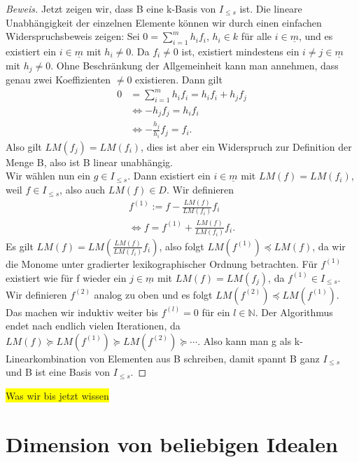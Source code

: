 \documentclass{article}
\newcommand*{\I}{I_{\leq s}}
\begin{document}
\begin{proof}[Beweis]
	Jetzt zeigen wir, dass B eine k-Basis von \(\I\) ist. Die lineare Unabhängigkeit der einzelnen 
	Elemente können wir durch einen einfachen Widerspruchsbeweis zeigen:
	Sei \(0 = \sum_{i=1}^{m} h_{i}f_{i}\), \(h_{i} \in k\) für alle \(i \in \underline{m}\),
	und es existiert ein \(i \in \underline{m}\) mit \(h_{i} \neq 0\).
	Da \(f_{i} \neq 0\) ist, existiert mindestens ein \(i \neq j \in \underline
	{m}\) mit \(h_{j} \neq 0\). Ohne Beschränkung der Allgemeinheit kann man annehmen, dass genau
	zwei Koeffizienten \(\neq 0\) existieren. Dann gilt
	\begin{align*}
		0 &= \sum_{i=1}^{m} h_{i}f_{i} = h_{i}f_{i} + h_{j}f_{j} \\
		&\Leftrightarrow -h_{j}f_{j} = h_{i}f_{i} \\
		&\Leftrightarrow -\frac{h_{j}}{h_{i}} f_{j} = f_{i}.
	\end{align*}
	Also gilt \(LM(f_{j}) = LM(f_{i})\), dies ist aber ein Widerspruch zur Definition der Menge B,
	also ist B linear unabhängig. \\
	Wir wählen nun ein \(g \in \I\). Dann existiert ein \(i \in \underline{m}\) mit \(LM(f) =
	LM(f_{i})\), weil \(f \in \I\), also auch \(LM(f) \in D\). Wir definieren
	\begin{align*}
		f^{(1)} := f - \frac{LM(f)}{LM(f_{i})}f_{i} \\
		\Leftrightarrow f = f^{(1)} + \frac{LM(f)}{LM(f_{i})}f_{i}.
	\end{align*}
	Es gilt \(LM(f) = LM(\frac{LM(f)}{LM(f_{i})}f_{i})\), also folgt \(LM(f^{(1)}) \preceq LM(f)\),
	da wir die Monome unter gradierter lexikographischer Ordnung betrachten.
	Für \(f^{(1)}\) existiert wie für f wieder ein \(j \in \underline{m}\) mit \(LM(f) =
	LM(f_{j})\), da \(f^{(1)} \in \I\). Wir definieren \(f^{(2)}\) analog zu oben und es
	folgt \(LM(f^{(2)}) \preceq LM(f^{(1)})\). Das machen wir induktiv weiter bis \(f^{(l)} = 0\)  
	für ein \(l \in \mathbb{N}\).
	Der Algorithmus endet nach endlich vielen Iterationen, da \(LM(f) \succeq LM(f^{(1)}) \succeq LM(f^{(2)}) \succeq \cdots\).
	Also kann man g als k-Linearkombination von Elementen aus B schreiben, damit spannt B ganz \(\I\) und B ist eine Basis von \(\I\).
	\end{proof}

	
	\colorbox{yellow}{Was wir bis jetzt wissen}


\section{Dimension von beliebigen Idealen}
\end{document}
